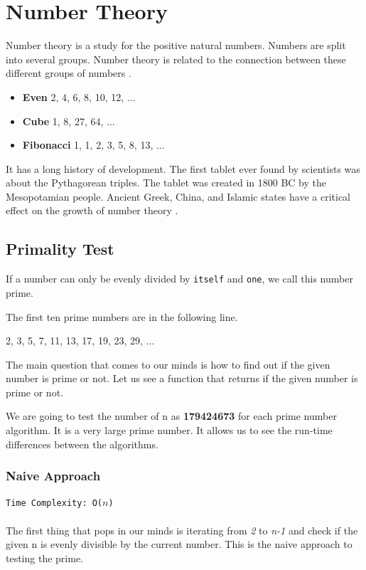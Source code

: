 \documentclass[12pt]{article}
\begin{document}
\section{Number Theory}
Number theory is a study for the positive natural numbers. Numbers are split into several groups. Number theory is related to the connection between these different groups of numbers  \cite{numbertheory}.
\begin{itemize}
  \item \textbf{Even} \hspace{19mm} 2, 4, 6, 8, 10, 12, ...
  \item \textbf{Cube} \hspace{19mm} 1, 8, 27, 64, ...
  \item \textbf{Fibonacci} \hspace{10mm} 1, 1, 2, 3, 5, 8, 13, ...
\end{itemize}


It has a long history of development. The first tablet ever found by scientists was about the Pythagorean triples. The tablet was created in 1800 BC by the Mesopotamian people. Ancient Greek, China, and Islamic states have a critical effect on the growth of number theory \cite{wikipedianumbertheory}.


\subsection{Primality Test}
If a number can only be evenly divided by \texttt{itself} and \texttt{one}, we call this number prime.

The first ten prime numbers are in the following line. 

2, 3, 5, 7, 11, 13, 17, 19, 23, 29, ...

The main question that comes to our minds is how to find out if the given number is prime or not. Let us see a function that returns if the given number is prime or not.  

We are going to test the number of n as \textbf{179424673} for each prime number algorithm.  It is a very large prime number. It allows us to see the run-time differences between the algorithms.
\clearpage

\subsubsection{Naive Approach}
\texttt{Time Complexity: O($n$)} \\ \\
The first thing that pops in our minds is iterating from \textit{2} to \textit{n-1} and check if the given n is evenly divisible by the current number. This is the naive approach to testing the prime.
\end{document}
